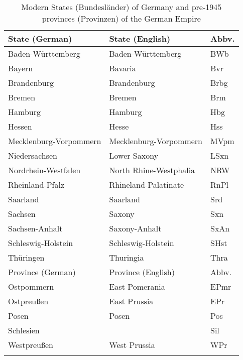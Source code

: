 \begin{table}
\caption{Modern States (Bundesländer) of Germany and pre-1945 provinces (Provinzen) of the German Empire}
\begin{tabularx}{\textwidth}{QQl}
\lsptoprule
 State (German) & State (English) & Abbv.\\\midrule
 Baden-Württemberg & Baden-Württemberg & BWb\\
 Bayern & Bavaria & Bvr\\
 Brandenburg & Brandenburg & Brbg\\
 Bremen & Bremen & Brm\\
 Hamburg & Hamburg & Hbg\\
 Hessen & Hesse & Hss\\
 Mecklenburg-Vorpommern & Mecklenburg-Vorpommern & MVpm\\
 Niedersachsen & Lower Saxony & LSxn\\
 Nordrhein-Westfalen & North Rhine-Westphalia & NRW\\
 Rheinland-Pfalz & Rhineland-Palatinate & RnPl\\
 Saarland & Saarland & Srd\\
 Sachsen & Saxony & Sxn\\
 Sachsen-Anhalt & Saxony-Anhalt & SxAn\\
 Schleswig-Holstein & Schleswig-Holstein & SHst\\
 Thüringen & Thuringia & Thra\\\midrule
Province (German) & Province (English) & Abbv.\\\midrule
Ostpommern & East Pomerania & EPmr\\
Ostpreußen & East Prussia & EPr\\
Posen & Posen & Pos\\
Schlesien &  & Sil\\
Westpreußen & West Prussia & WPr\\
\lspbottomrule
\end{tabularx}
\end{table}

